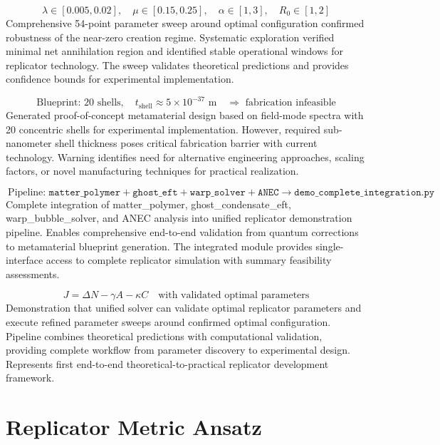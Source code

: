 \documentclass[11pt]{article}
\begin{document}
\[\
\lambda \in [0.005, 0.02], \quad \mu \in [0.15, 0.25], \quad \alpha \in [1, 3], \quad R_0 \in [1, 2]
\]
Comprehensive 54-point parameter sweep around optimal configuration confirmed robustness of the near-zero creation regime. Systematic exploration verified minimal net annihilation region and identified stable operational windows for replicator technology. The sweep validates theoretical predictions and provides confidence bounds for experimental implementation.

\[\
\text{Blueprint: } 20\text{ shells}, \quad t_{\text{shell}} \approx 5 \times 10^{-37}\text{ m} \quad \Rightarrow \text{ fabrication infeasible}
\]
Generated proof-of-concept metamaterial design based on field-mode spectra with 20 concentric shells for experimental implementation. However, required sub-nanometer shell thickness poses critical fabrication barrier with current technology. Warning identifies need for alternative engineering approaches, scaling factors, or novel manufacturing techniques for practical realization.

\[\
\text{Pipeline: } \texttt{matter\_polymer} + \texttt{ghost\_eft} + \texttt{warp\_solver} + \texttt{ANEC} \rightarrow \texttt{demo\_complete\_integration.py}
\]
Complete integration of matter_polymer, ghost_condensate_eft, warp_bubble_solver, and ANEC analysis into unified replicator demonstration pipeline. Enables comprehensive end-to-end validation from quantum corrections to metamaterial blueprint generation. The integrated module provides single-interface access to complete replicator simulation with summary feasibility assessments.

\[\
J = \Delta N - \gamma A - \kappa C \quad \text{with validated optimal parameters}
\]
Demonstration that unified solver can validate optimal replicator parameters and execute refined parameter sweeps around confirmed optimal configuration. Pipeline combines theoretical predictions with computational validation, providing complete workflow from parameter discovery to experimental design. Represents first end-to-end theoretical-to-practical replicator development framework.

\section{Replicator Metric Ansatz}
\end{document}

